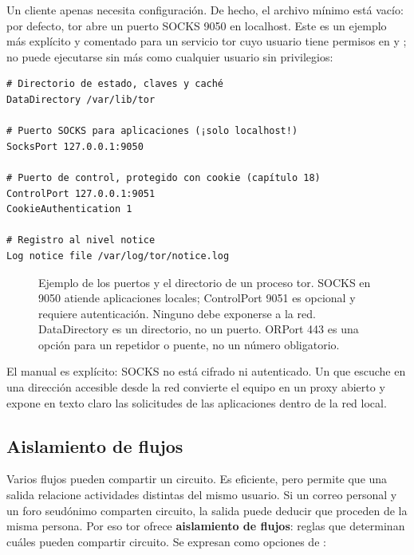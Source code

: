 Un cliente apenas necesita configuración. De hecho, el archivo mínimo está vacío: por defecto, tor abre un puerto SOCKS 9050 en localhost. Este es un ejemplo más explícito y comentado para un servicio tor cuyo usuario tiene permisos en  y ; no puede ejecutarse sin más como cualquier usuario sin privilegios:
\begin{lstlisting}[language=torrc]
# Directorio de estado, claves y caché
DataDirectory /var/lib/tor

# Puerto SOCKS para aplicaciones (¡solo localhost!)
SocksPort 127.0.0.1:9050

# Puerto de control, protegido con cookie (capítulo 18)
ControlPort 127.0.0.1:9051
CookieAuthentication 1

# Registro al nivel notice
Log notice file /var/log/tor/notice.log
\end{lstlisting}

\begin{figure}[htbp]
\centering

\caption{Ejemplo de los puertos y el directorio de un proceso tor. SOCKS en 9050 atiende aplicaciones locales; ControlPort 9051 es opcional y requiere autenticación. Ninguno debe exponerse a la red. DataDirectory es un directorio, no un puerto. ORPort 443 es una opción para un repetidor o puente, no un número obligatorio.}
\label{fig:porte}
\end{figure}

\begin{attenzione}
El manual es explícito: SOCKS no está cifrado ni autenticado. Un  que escuche en una dirección accesible desde la red convierte el equipo en un proxy abierto y expone en texto claro las solicitudes de las aplicaciones dentro de la red local.
\end{attenzione}

\subsection{Aislamiento de flujos}\label{sec:torrc-isolamento}

Varios flujos pueden compartir un circuito. Es eficiente, pero permite que una salida relacione actividades distintas del mismo usuario. Si un correo personal y un foro seudónimo comparten circuito, la salida puede deducir que proceden de la misma persona. Por eso tor ofrece \textbf{aislamiento de flujos}: reglas que determinan cuáles pueden compartir circuito. Se expresan como opciones de :

